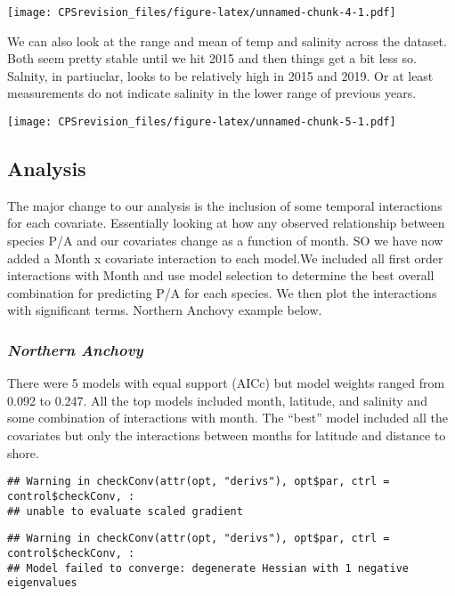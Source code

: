 \documentclass[
]{article}
\begin{document}
\texttt{[image: CPSrevision\_files/figure-latex/unnamed-chunk-4-1.pdf]}

We can also look at the range and mean of temp and salinity across the
dataset. Both seem pretty stable until we hit 2015 and then things get a
bit less so. Salnity, in partiuclar, looks to be relatively high in 2015
and 2019. Or at least measurements do not indicate salinity in the lower
range of previous years.

\texttt{[image: CPSrevision\_files/figure-latex/unnamed-chunk-5-1.pdf]}

\hypertarget{analysis}{%
\subsection{Analysis}\label{analysis}}

The major change to our analysis is the inclusion of some temporal
interactions for each covariate. Essentially looking at how any observed
relationship between species P/A and our covariates change as a function
of month. SO we have now added a Month x covariate interaction to each
model.We included all first order interactions with Month and use model
selection to determine the best overall combination for predicting P/A
for each species. We then plot the interactions with significant terms.
Northern Anchovy example below.

\hypertarget{northern-anchovy}{%
\subsubsection{\texorpdfstring{\emph{Northern
Anchovy}}{Northern Anchovy}}\label{northern-anchovy}}

There were 5 models with equal support (AICc) but model weights ranged
from 0.092 to 0.247. All the top models included month, latitude, and
salinity and some combination of interactions with month. The ``best''
model included all the covariates but only the interactions between
months for latitude and distance to shore.

\begin{verbatim}
## Warning in checkConv(attr(opt, "derivs"), opt$par, ctrl = control$checkConv, :
## unable to evaluate scaled gradient
\end{verbatim}

\begin{verbatim}
## Warning in checkConv(attr(opt, "derivs"), opt$par, ctrl = control$checkConv, :
## Model failed to converge: degenerate Hessian with 1 negative eigenvalues
\end{verbatim}
\end{document}
